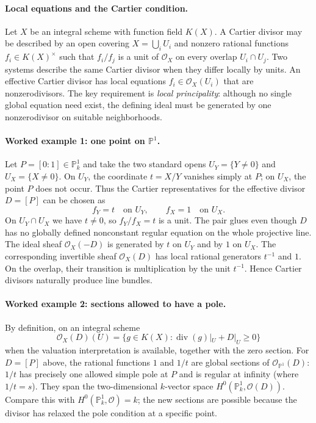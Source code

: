 \paragraph{Local equations and the Cartier condition.}
Let $X$ be an integral scheme with function field $K(X)$.
A Cartier divisor may be described by an open covering
$X=\bigcup_iU_i$ and nonzero rational functions
$f_i\in K(X)^\times$ such that $f_i/f_j$ is a unit of
$\mathcal O_X$ on every overlap $U_i\cap U_j$.
Two systems describe the same Cartier divisor when they differ
locally by units.  An effective Cartier divisor has local equations
$f_i\in\mathcal O_X(U_i)$ that are nonzerodivisors.
The key requirement is \emph{local principality}: although no
single global equation need exist, the defining ideal must be
generated by one nonzerodivisor on suitable neighborhoods.

\paragraph{Worked example 1: one point on $\mathbb P^1$.}
Let $P=[0:1]\in\mathbb P_k^1$ and take the two standard opens
$U_Y=\{Y\ne0\}$ and $U_X=\{X\ne0\}$.
On $U_Y$, the coordinate $t=X/Y$ vanishes simply at $P$;
on $U_X$, the point $P$ does not occur.  Thus the Cartier
representatives for the effective divisor $D=[P]$ can be chosen as
\[
 f_Y=t\quad\text{on }U_Y,\qquad
 f_X=1\quad\text{on }U_X.
\]
On $U_Y\cap U_X$ we have $t\ne0$, so $f_Y/f_X=t$ is a unit.
The pair glues even though $D$ has no globally defined nonconstant
regular equation on the whole projective line.
The ideal sheaf $\mathcal O_X(-D)$ is generated by $t$ on $U_Y$
and by $1$ on $U_X$.  The corresponding invertible sheaf
$\mathcal O_X(D)$ has local rational generators $t^{-1}$ and $1$.
On the overlap, their transition is multiplication by the unit
$t^{-1}$.  Hence Cartier divisors naturally produce line bundles.

\paragraph{Worked example 2: sections allowed to have a pole.}
By definition, on an integral scheme
\[
 \mathcal O_X(D)(U)
  =\{g\in K(X):\operatorname{div}(g)|_U+D|_U\geq0\}
\]
when the valuation interpretation is available, together with the
zero section.  For $D=[P]$ above, the rational functions $1$ and
$1/t$ are global sections of $\mathcal O_{\mathbb P^1}(D)$:
$1/t$ has precisely one allowed simple pole at $P$ and is regular
at infinity (where $1/t=s$).  They span the two-dimensional
$k$-vector space $H^0(\mathbb P_k^1,\mathcal O(D))$.
Compare this with $H^0(\mathbb P_k^1,\mathcal O)=k$;
the new sections are possible because the divisor has relaxed the
pole condition at a specific point.

